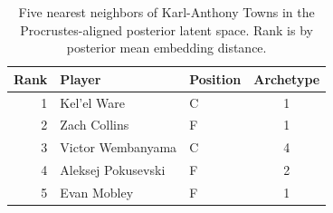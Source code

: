 \begin{table}[htbp]
  \centering\small
  \begin{tabular}{rllc}
    \toprule
    Rank & Player & Position & Archetype \\
    \midrule
    1 & Kel'el Ware & C & 1 \\
    2 & Zach Collins & F & 1 \\
    3 & Victor Wembanyama & C & 4 \\
    4 & Aleksej Pokusevski & F & 2 \\
    5 & Evan Mobley & F & 1 \\
    \bottomrule
  \end{tabular}
  \caption{Five nearest neighbors of Karl-Anthony Towns in the Procrustes-aligned posterior latent space. Rank is by posterior mean embedding distance.}
  \label{tab:Karl_Anthony_Towns_neighbors}
\end{table}

